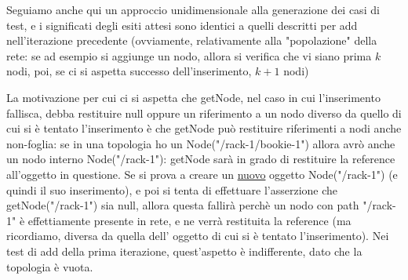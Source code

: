 \documentclass[10pt, a4paper]{article}
\begin{document}
	Seguiamo anche qui un approccio unidimensionale alla generazione dei casi di test, e i significati
	degli esiti attesi sono identici a quelli descritti per add nell'iterazione precedente (ovviamente,
	relativamente alla "popolazione" della rete: se ad esempio si aggiunge un nodo, allora si verifica che
	vi siano prima $k$ nodi, poi, se ci si aspetta successo dell'inserimento, $k+1$ nodi)
	
	La motivazione per cui ci si aspetta che getNode, nel caso in cui l'inserimento fallisca, debba restituire
	null oppure un riferimento a un nodo diverso da quello di cui si è tentato l'inserimento è che getNode
	può restituire riferimenti a nodi anche non-foglia: se in una topologia ho un Node("/rack-1/bookie-1") allora
	avrò anche un nodo interno Node("/rack-1"): getNode sarà in grado di restituire la reference all'oggetto
	in questione. Se si prova a creare un \underline{nuovo} oggetto Node("/rack-1") (e quindi il suo inserimento),
	 e poi si tenta di effettuare
	l'asserzione che getNode("/rack-1") sia null, allora questa fallirà perchè un nodo con path "/rack-1" è
	effettiamente presente in rete, e ne verrà restituita la reference (ma ricordiamo, diversa da quella dell'
	oggetto di cui si è tentato l'inserimento). Nei test di add della prima iterazione, quest'aspetto è 
	indifferente, dato che la topologia è vuota.
	
\end{document}
